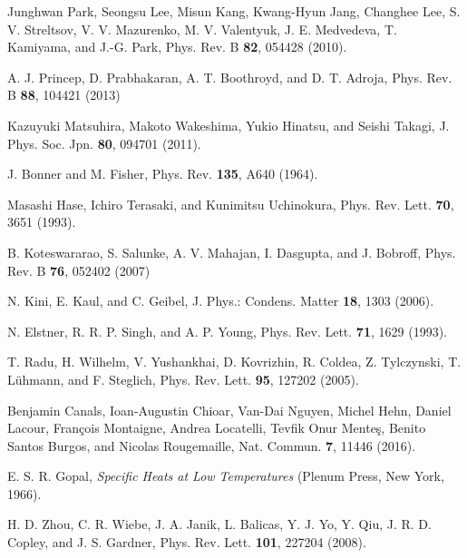 \documentclass[aps,prl,reprint,amsmath,amssymb,superscriptaddress,showpacs]{revtex4-1}
\begin{document}
\begin{thebibliography}{99}
 Junghwan Park, Seongsu Lee, Misun Kang, Kwang-Hyun Jang, Changhee Lee, S. V. Streltsov, V. V. Mazurenko, M. V. Valentyuk, J. E. Medvedeva, T. Kamiyama, and J.-G. Park, Phys. Rev. B \textbf{82}, 054428 (2010).

 A. J. Princep, D. Prabhakaran, A. T. Boothroyd, and D. T. Adroja, Phys. Rev. B \textbf{88}, 104421 (2013)

 Kazuyuki Matsuhira, Makoto Wakeshima, Yukio Hinatsu, and Seishi Takagi, J. Phys. Soc. Jpn. \textbf{80}, 094701 (2011).

 J. Bonner and M. Fisher, Phys. Rev. \textbf{135}, A640 (1964).

 Masashi Hase, Ichiro Terasaki, and Kunimitsu Uchinokura, Phys. Rev. Lett. \textbf{70}, 3651 (1993).

 B. Koteswararao, S. Salunke, A. V. Mahajan, I. Dasgupta, and J. Bobroff, Phys. Rev. B \textbf{76}, 052402 (2007)

 N. Kini, E. Kaul, and C. Geibel, J. Phys.: Condens. Matter \textbf{18},
1303 (2006).

 N. Elstner, R. R. P. Singh, and A. P. Young, Phys. Rev. Lett. \textbf{71}, 1629 (1993).

 T. Radu, H. Wilhelm, V. Yushankhai, D. Kovrizhin, R. Coldea, Z. Tylczynski, T. Lühmann, and F. Steglich, Phys. Rev. Lett. \textbf{95}, 127202 (2005).

 Benjamin Canals, Ioan-Augustin Chioar, Van-Dai Nguyen, Michel Hehn, Daniel Lacour, Fran\c{c}ois Montaigne, Andrea Locatelli, Tevfik Onur Mente\c{s}, Benito Santos Burgos, and Nicolas Rougemaille, Nat. Commun. \textbf{7}, 11446 (2016).

 E. S. R. Gopal, \textit{Specific Heats at Low Temperatures} (Plenum Press, New York, 1966).

 H. D. Zhou, C. R. Wiebe, J. A. Janik, L. Balicas, Y. J. Yo, Y. Qiu, J. R. D. Copley, and J. S. Gardner, Phys. Rev. Lett. \textbf{101}, 227204 (2008).


\end{thebibliography}
\end{document}
